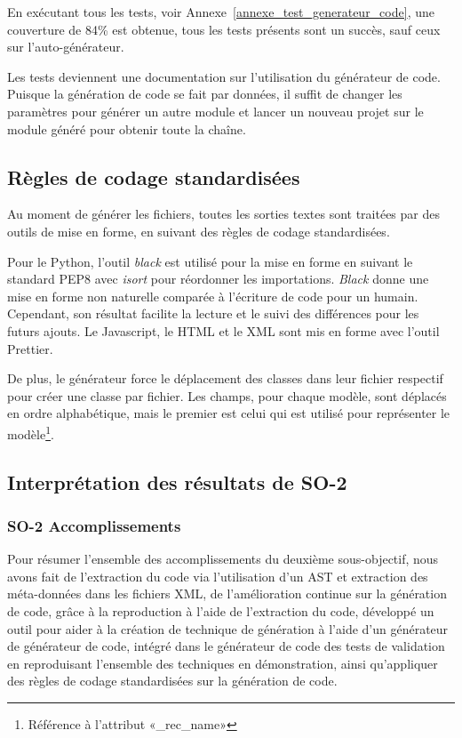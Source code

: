 En exécutant tous les tests, voir Annexe~\ref{annexe_test_generateur_code}, une couverture de 84\% est obtenue, tous les tests présents sont un succès, sauf ceux sur l’auto-générateur.

Les tests deviennent une documentation sur l'utilisation du générateur de code. Puisque la génération de code se fait par données, il suffit de changer les paramètres pour générer un autre module et lancer un nouveau projet sur le module généré pour obtenir toute la chaîne.

\subsection {Règles de codage standardisées}

Au moment de générer les fichiers, toutes les sorties textes sont traitées par des outils de mise en forme, en suivant des règles de codage standardisées.

Pour le Python, l’outil \textit{black} est utilisé pour la mise en forme en suivant le standard PEP8 avec \textit{isort} pour réordonner les importations. \textit{Black} donne une mise en forme non naturelle comparée à l’écriture de code pour un humain. Cependant, son résultat facilite la lecture et le suivi des différences pour les futurs ajouts. Le Javascript, le HTML et le XML sont mis en forme avec l’outil Prettier.

De plus, le générateur force le déplacement des classes dans leur fichier respectif pour créer une classe par fichier. Les champs, pour chaque modèle, sont déplacés en ordre alphabétique, mais le premier est celui qui est utilisé pour représenter le modèle\footnote{Référence à l'attribut «\_rec\_name»}.

\subsection{Interprétation des résultats de SO-2}

\subsubsection{SO-2 Accomplissements}
Pour résumer l'ensemble des accomplissements du deuxième sous-objectif, nous avons fait de l'extraction du code via l’utilisation d’un AST et extraction des méta-données dans les fichiers XML, de l'amélioration continue sur la génération de code, grâce à la reproduction à l’aide de l’extraction du code, développé un outil pour aider à la création de technique de génération à l’aide d’un générateur de générateur de code, intégré dans le générateur de code des tests de validation en reproduisant l’ensemble des techniques en démonstration, ainsi qu'appliquer des règles de codage standardisées sur la génération de code.

